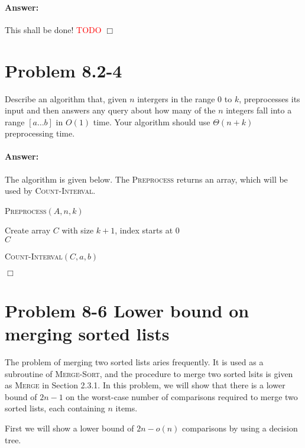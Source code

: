\documentclass[a4paper,10pt]{article}
\newcommand{\problem}[1]{\section*{Problem #1}}
\newcommand{\answer}{\paragraph{Answer:}}
\newcommand{\qed}{\hfill \ensuremath{\Box}}
\newcommand{\todo}{\textcolor{red}{TODO}{} }
\begin{document}
\answer

This shall be done!
\todo
\qed

\problem{8.2-4}
Describe an algorithm that, given $n$ intergers in the range 0 to $k$, preprocesses its input and then answers
any query about how many of the $n$ integers fall into a range
$[a\ldots b]$ in $O(1)$ time. Your algorithm should use $\Theta(n + k)$ preprocessing time.
\answer

The algorithm is given below. The \textsc{Preprocess} returns an array, which will be used by \textsc{Count-Interval}.

\begin{algorithm}[H]
\caption{\textsc{Preprocess}$(A, n, k)$}
Create array $C$ with size $k + 1$, index starts at $0$\\
\Return $C$
\end{algorithm}

\begin{algorithm}[H]
\caption{\textsc{Count-Interval}$(C, a, b)$}
\end{algorithm}
\qed



\problem{8-6 Lower bound on merging sorted lists}

The problem of merging two sorted lists aries frequently. It is used as a subroutine of \textsc{Merge-Sort},
and the procedure to merge two sorted lsits is given as \textsc{Merge} in Section 2.3.1. In this problem,
we will show that there is a lower bound of $2n-1$ on the worst-case number of comparisons required to 
merge two sorted lists, each containing $n$ items.

First we will show a lower bound of $2n-o(n)$ comparisons by using a decision tree.
\end{document}
